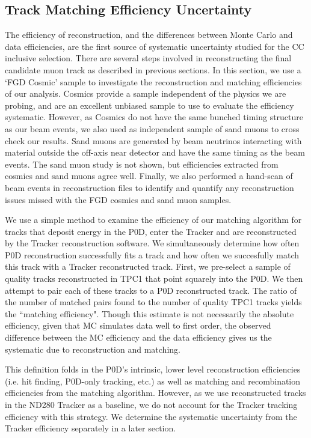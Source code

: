 \subsection{Track Matching Efficiency Uncertainty}
\label{sec:matchingsyst}

The efficiency of reconstruction, and the differences between Monte Carlo and data efficiencies, are the first source of systematic uncertainty studied for the CC inclusive selection. There are several steps involved in reconstructing the final candidate muon track as described in previous sections. In this section, we use a `FGD Cosmic' sample to  investigate the reconstruction and matching efficiencies of our analysis. Cosmics provide a sample independent of the physics we are probing, and are an excellent unbiased sample to use to evaluate the efficiency systematic. However, as Cosmics do not have the same bunched timing structure as our beam events, we also used as independent sample of sand muons to cross check our results. Sand muons are generated by beam neutrinos interacting with material outside the off-axis near detector and have the same timing as the beam events. The sand muon study is not shown, but efficiencies extracted from cosmics and sand muons agree well. Finally, we also performed a hand-scan of beam events in reconstruction files to identify and quantify any reconstruction issues missed with the FGD cosmics and sand muon samples.

We use a simple method to examine the efficiency of our matching algorithm for tracks that deposit energy in the P0D, enter the Tracker and are reconstructed by the Tracker reconstruction software. We simultaneously determine how often P0D reconstruction successfully fits a track and how often we succesfully match this track with a Tracker reconstructed track. First, we pre-select a sample of quality tracks reconstructed in TPC1 that point squarely into the 
P0D. We then attempt to pair each of these tracks to a P0D reconstructed track. The ratio of the number of matched pairs found to the number of quality TPC1 tracks yields the ``matching efficiency". Though this estimate is not necessarily the absolute efficiency, given that MC simulates data well to first order, the observed difference between the MC efficiency and the data efficiency gives us the systematic due to reconstruction and matching.

This definition folds in the P0D's intrinsic, lower level reconstruction efficiencies (i.e. hit finding, P0D-only tracking, etc.) as well as matching and recombination efficiencies from the matching algorithm. However, as we use reconstructed tracks in the ND280 Tracker as a baseline, we do not account for the Tracker tracking efficiency with this strategy. We determine the systematic uncertainty from the Tracker efficiency separately in a later section.


